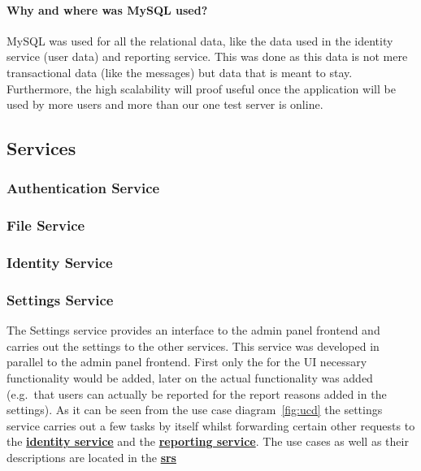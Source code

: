 \paragraph{Why and where was MySQL used?}
MySQL was used for all the relational data, like the data used in the identity service (user data) and reporting
service.
This was done as this data is not mere transactional data (like the messages) but data that is meant to stay.
Furthermore, the high scalability will proof useful once the application will be used by more users and more than our
one test server is online.

\subsection{Services}\label{subsec:services2}

\subsubsection{Authentication Service}

\subsubsection{File Service}

\subsubsection{Identity Service}
\label{subsubsec:identitySer}

\subsubsection{Settings Service}\label{subsubsec:settingsSer}

The Settings service provides an interface to the admin panel frontend and carries out the settings to the other
services.
This service was developed in parallel to the admin panel frontend. %
First only the for the UI necessary functionality would be added, later on the actual functionality was added
(e.g.\ that users can actually be reported for the report reasons added in the settings).
As it can be seen from the use case diagram~\ref{fig:ucd} the settings service carries out a few tasks by itself whilst
forwarding certain other requests to the \hyperref[subsubsec:identitySer]{\textbf{identity service}} and the
\hyperref[subsubsec:reportingSer]{\textbf{reporting service}}.
The use cases as well as their descriptions are located in the
\hyperref[ch:software-requirements-specification-(srs)]{\textbf{\ac{srs}}}

